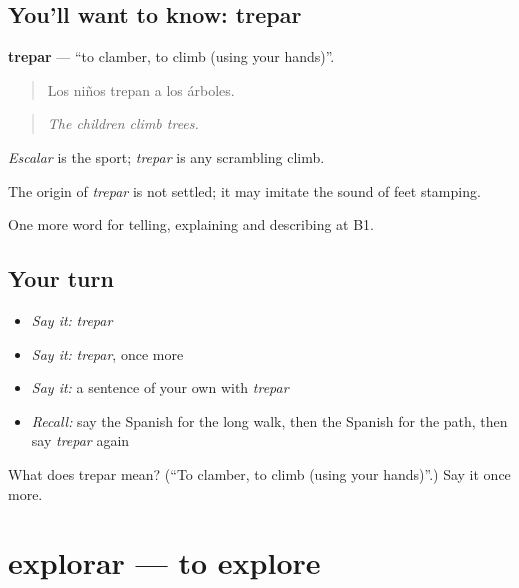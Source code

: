 \subsection*{You'll want to know: trepar}
\textbf{trepar} — \textquotedblleft{}to clamber, to climb (using your hands)\textquotedblright{}.

\begin{quote}
Los niños trepan a los árboles.
\end{quote}

\begin{quote}
\emph{The children climb trees.}
\end{quote}

\emph{Escalar} is the sport; \emph{trepar} is any scrambling climb.

\begin{cousinweb}
The origin of \emph{trepar} is not settled; it may imitate the sound of feet stamping.
\end{cousinweb}

\begin{grammarlens}[title={What you've built}]
One more word for telling, explaining and describing at B1.
\end{grammarlens}

\subsection*{Your turn}
\begin{itemize}
\raggedright
  \item \emph{Say it:} \emph{trepar}
  \item \emph{Say it:} \emph{trepar}, once more
  \item \emph{Say it:} a sentence of your own with \emph{trepar}
  \item \emph{Recall:} say the Spanish for the long walk, then the Spanish for the path, then say \emph{trepar} again
\end{itemize}

\begin{tcolorbox}[breakable,colback=teal!4,colframe=teal!35!black,title={Before you move on}]
What does trepar mean? (\textquotedblleft{}To clamber, to climb (using your hands)\textquotedblright{}.) Say it once more.
\end{tcolorbox}
\section[explorar]{explorar — to explore}

